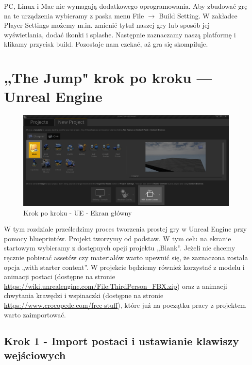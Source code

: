\documentclass[openright]{xmgr}
\begin{document}
PC, Linux i Mac nie wymagają dodatkowego oprogramowania. Aby zbudować grę na te urządzenia wybieramy z paska menu File $\rightarrow$ Build Setting. W zakładce Player Settings możemy m.in. zmienić tytuł naszej gry lub sposób jej wyświetlania, dodać ikonki i splashe. Następnie zaznaczamy naszą platformę i klikamy przycisk build. Pozostaje nam czekać, aż gra się skompiluje.

\chapter{„The Jump" krok po kroku — Unreal Engine}

\begin{figure}[!htb]
    \begin{center}
    \includegraphics[scale=0.35]{Screeny/UeKrokPoKroku/UE-Climb-NewProject.png}
    \end{center}
    \caption{Krok po kroku - UE - Ekran główny}
\end{figure}

W tym rozdziale prześledzimy proces tworzenia prostej gry w Unreal Engine przy pomocy blueprintów. Projekt tworzymy od podstaw. W tym celu na ekranie startowym wybieramy z dostępnych opcji projektu „Blank”. Jeżeli nie chcemy ręcznie pobierać assetów czy materiałów warto upewnić się, że zaznaczona została opcja „with starter content”. W projekcie będziemy również korzystać z modelu i animacji postaci (dostępne na stronie \url{https://wiki.unrealengine.com/File:ThirdPerson_FBX.zip}) oraz z animacji chwytania krawędzi i wspinaczki (dostępne na stronie \url{https://www.crocopede.com/free-stuff}), które już na początku pracy z projektem warto zaimportować.

\section{Krok 1 - Import postaci i ustawianie klawiszy wejściowych}
\end{document}
